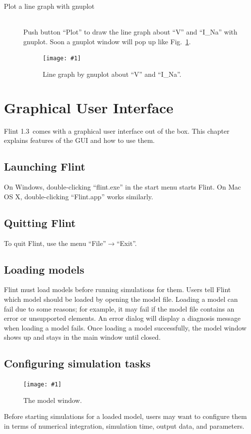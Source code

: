 \documentclass[a4paper,10pt]{report}
\def\FlintVersion{1.3}
\def\Flint{Flint \FlintVersion}
\newcommand\FigureOfImage[2]{\begin{figure}[h]
  \centering
  \texttt{[image: \#1]}
  \caption{#2}\label{fig:#1}
\end{figure}}
\begin{document}
\begin{description}
\item[Plot a line graph with gnuplot] \hfill \\
Push button ``Plot'' to draw the line graph about ``V'' and ``I\_Na'' with
gnuplot. Soon a gnuplot window will pop up like Fig.~\ref{fig:hh-gnuplot}.
\FigureOfImage{hh-gnuplot}{Line graph by gnuplot about ``V'' and ``I\_Na''.}
\end{description}



\chapter{Graphical User Interface}
\Flint\ comes with a graphical user interface out of the box. This chapter
explains features of the GUI and how to use them.

\section{Launching Flint}
On Windows, double-clicking ``flint.exe'' in the start menu starts Flint.
On Mac OS X, double-clicking ``Flint.app'' works similarly.

\section{Quitting Flint}
To quit Flint, use the menu ``File''$\rightarrow$``Exit''.

\section{Loading models}
Flint must load models before running simulations for them.
Users tell Flint which model should be loaded by opening the model file.
Loading a model can fail due to some reasons; for example, it may fail if
the model file contains an error or unsupported elements.
An error dialog will display a diagnosis message when loading a model fails.
Once loading a model successfully, the model window shows up and stays
in the main window until closed.

\section{Configuring simulation tasks}
\FigureOfImage{lr}{The model window.}
Before starting simulations for a loaded model, users may want to configure them
in terms of numerical integration, simulation time, output data, and parameters.
\end{document}
